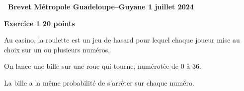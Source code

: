 \documentclass[11pt]{article}
\begin{document}
\hypertarget{Metropole}{}
\label{Metropole}
\pagestyle{fancy}
\thispagestyle{empty}
\begin{center} {\Large \textbf{\decofourleft~Brevet Métropole Guadeloupe--Guyane 1 juillet 2024 \decofourright}}
	\end{center}

\bigskip

{\large \textbf{Exercice 1 \hfill 20 points}}

\medskip

Au casino, la roulette est un jeu de hasard pour lequel chaque joueur mise au choix sur un ou plusieurs numéros.

On lance une bille sur une roue qui tourne, numérotée de 0 à 36.

La bille a la même probabilité de s'arrêter sur chaque numéro.
\end{document}
